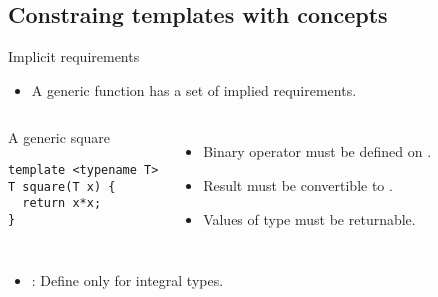 \subsection{Constraing templates with concepts}

\begin{frame}[t,fragile]{Implicit requirements}
\begin{itemize}
  \item A generic function has a set of implied requirements.
\end{itemize}

\begin{columns}[T]

\begin{block}{A generic square}
\begin{lstlisting}
template <typename T>
T square(T x) {
  return x*x;
}
\end{lstlisting}
\end{block}

\begin{itemize}
  \item Binary operator \cppkey{*} must be defined on .
  \item Result must be convertible to .
  \item Values of type  must be returnable.
\end{itemize}

\end{columns}

\begin{itemize}
  \item {}: Define only for integral types.
\end{itemize}

\end{frame}

